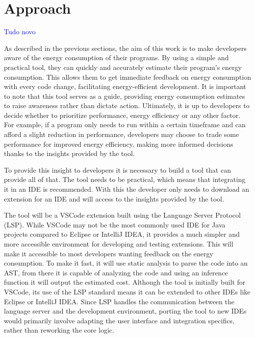 \chapter{Approach}\label{chapter:approach} \textcolor{blue}{Tudo novo}


As described in the previous sections, the aim of this work is to make developers aware of the energy consumption of their programs. By using a simple and practical tool, they can quickly and accurately estimate their program's energy consumption. This allows them to get immediate feedback on energy consumption with every code change, facilitating energy-efficient development. It is important to note that this tool serves as a guide, providing energy consumption estimates to raise awareness rather than dictate action. Ultimately, it is up to developers to decide whether to prioritize performance, energy efficiency or any other factor. For example, if a program only needs to run within a certain timeframe and can afford a slight reduction in performance, developers may choose to trade some performance for improved energy efficiency, making more informed decisions thanks to the insights provided by the tool.

To provide this insight to developers it is necessary to build a tool that can provide all of that. The tool needs to be practical, which means that integrating it in an IDE is recommended. With this the developer only needs to download an extension for an IDE and will access to the insights provided by the tool.


The tool will be a VSCode extension built using the Language Server Protocol (LSP). While VSCode may not be the most commonly used IDE for Java projects compared to Eclipse or IntelliJ IDEA, it provides a much simpler and more accessible environment for developing and testing extensions. This will make it accessible to most developers wanting feedback on the energy consumption. To make it fast, it will use static analysis to parse the code into an AST, from there it is capable of analyzing the code and using an inference function it will output the estimated cost.
Although the tool is initially built for VSCode, its use of the LSP standard means it can be extended to other IDEs like Eclipse or IntelliJ IDEA. Since LSP handles the communication between the language server and the development environment, porting the tool to new IDEs would primarily involve adapting the user interface and integration specifics, rather than reworking the core logic.


